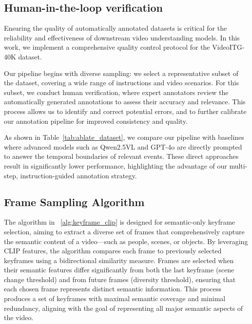 \subsection{Human-in-the-loop verification}

Ensuring the quality of automatically annotated datasets is critical for the reliability and effectiveness of downstream video understanding models. In this work, we implement a comprehensive quality control protocol for the VideoITG-40K dataset.

Our pipeline begins with diverse sampling: we select a representative subset of the dataset, covering a wide range of instructions and video scenarios. For this subset, we conduct human verification, where expert annotators review the automatically generated annotations to assess their accuracy and relevance. This process allows us to identify and correct potential errors, and to further calibrate our annotation pipeline for improved consistency and quality.

As shown in Table~\ref{tab:ablate_dataset}, we compare our pipeline with baselines where advanced models such as Qwen2.5VL and GPT-4o are directly prompted to answer the temporal boundaries of relevant events. These direct approaches result in significantly lower performance, highlighting the advantage of our multi-step, instruction-guided annotation strategy.




\subsection{Frame Sampling Algorithm}
The algorithm in ~\ref{alg:keyframe_clip} is designed for semantic-only keyframe selection, aiming to extract a diverse set of frames that comprehensively capture the semantic content of a video—such as people, scenes, or objects. By leveraging CLIP features, the algorithm compares each frame to previously selected keyframes using a bidirectional similarity measure. Frames are selected when their semantic features differ significantly from both the last keyframe (scene change threshold) and from future frames (diversity threshold), ensuring that each chosen frame represents distinct semantic information. This process produces a set of keyframes with maximal semantic coverage and minimal redundancy, aligning with the goal of representing all major semantic aspects of the video.




